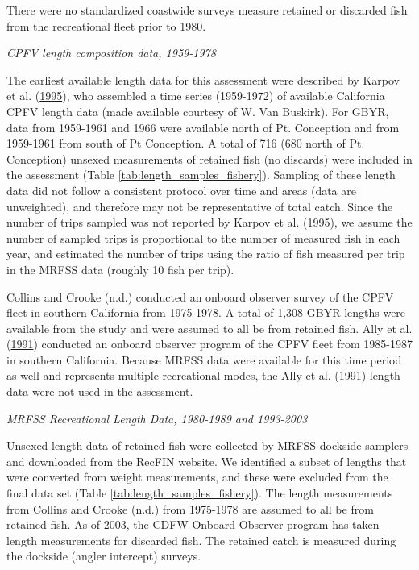 \documentclass[12pt,]{article}
\begin{document}
There were no standardized coastwide surveys measure retained or
discarded fish from the recreational fleet prior to 1980.

\emph{CPFV length composition data, 1959-1978}

The earliest available length data for this assessment were described by
Karpov et al. (\protect\hyperlink{ref-Karpov1995}{1995}), who assembled
a time series (1959-1972) of available California CPFV length data (made
available courtesy of W. Van Buskirk). For GBYR, data from 1959-1961 and
1966 were available north of Pt. Conception and from 1959-1961 from
south of Pt Conception. A total of 716 (680 north of Pt. Conception)
unsexed measurements of retained fish (no discards) were included in the
assessment (Table \ref{tab:length_samples_fishery}). Sampling of these
length data did not follow a consistent protocol over time and areas
(data are unweighted), and therefore may not be representative of total
catch. Since the number of trips sampled was not reported by Karpov et
al. (1995), we assume the number of sampled trips is proportional to the
number of measured fish in each year, and estimated the number of trips
using the ratio of fish measured per trip in the MRFSS data (roughly 10
fish per trip).

Collins and Crooke (n.d.) conducted an onboard observer survey of the
CPFV fleet in southern California from 1975-1978. A total of 1,308 GBYR
lengths were available from the study and were assumed to all be from
retained fish. Ally et al. (\protect\hyperlink{ref-Ally1991}{1991})
conducted an onboard observer program of the CPFV fleet from 1985-1987
in southern California. Because MRFSS data were available for this time
period as well and represents multiple recreational modes, the Ally et
al. (\protect\hyperlink{ref-Ally1991}{1991}) length data were not used
in the assessment.

\emph{MRFSS Recreational Length Data, 1980-1989 and 1993-2003}

Unsexed length data of retained fish were collected by MRFSS dockside
samplers and downloaded from the RecFIN website. We identified a subset
of lengths that were converted from weight measurements, and these were
excluded from the final data set (Table
\ref{tab:length_samples_fishery}). The length measurements from Collins
and Crooke (n.d.) from 1975-1978 are assumed to all be from retained
fish. As of 2003, the CDFW Onboard Observer program has taken length
measurements for discarded fish. The retained catch is measured during
the dockside (angler intercept) surveys.
\end{document}
